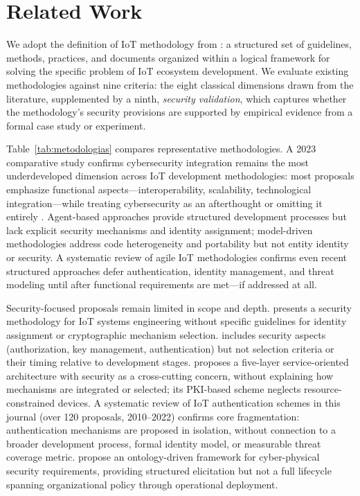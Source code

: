 \documentclass[preprint,12pt,authoryear]{elsarticle}
\begin{document}
\section{Related Work}
\label{sec:related}

We adopt the definition of IoT methodology from \citet{fortino2020internet}: a structured set of guidelines, methods, practices, and documents organized within a logical framework for solving the specific problem of IoT ecosystem development. We evaluate existing methodologies against nine criteria: the eight classical dimensions drawn from the literature, supplemented by a ninth, \emph{security validation}, which captures whether the methodology's security provisions are supported by empirical evidence from a formal case study or experiment.

Table~\ref{tab:metodologias} compares representative methodologies. A 2023 comparative study \citep{moreta2023comparison} confirms cybersecurity integration remains the most underdeveloped dimension across IoT development methodologies: most proposals emphasize functional aspects---interoperability, scalability, technological integration---while treating cybersecurity as an afterthought or omitting it entirely \citep{fortino2020internet, al2015internet, merzouk2020iot}. Agent-based approaches \citep{manate2014applying, ayala2015software, spanoudakis2015engineering} provide structured development processes but lack explicit security mechanisms and identity assignment; model-driven methodologies \citep{morin2017model, costa2016modeling, cicirelli2017metamodeling} address code heterogeneity and portability but not entity identity or security. A systematic review of agile IoT methodologies \citep{guerrero2023agile} confirms even recent structured approaches defer authentication, identity management, and threat modeling until after functional requirements are met---if addressed at all.

Security-focused proposals remain limited in scope and depth. \citet{josyula2017new} presents a security methodology for IoT systems engineering without specific guidelines for identity assignment or cryptographic mechanism selection. \citet{savaglio2018methodology} includes security aspects (authorization, key management, authentication) but not selection criteria or their timing relative to development stages. \citet{munoz2025internet} proposes a five-layer service-oriented architecture with security as a cross-cutting concern, without explaining how mechanisms are integrated or selected; its PKI-based scheme neglects resource-constrained devices. A systematic review of IoT authentication schemes in this journal \citep{saqib2023systematic} (over 120 proposals, 2010--2022) confirms core fragmentation: authentication mechanisms are proposed in isolation, without connection to a broader development process, formal identity model, or measurable threat coverage metric. \citet{blanco2023onto} propose an ontology-driven framework for cyber-physical security requirements, providing structured elicitation but not a full lifecycle spanning organizational policy through operational deployment.
\end{document}
